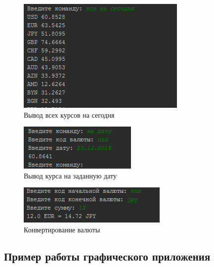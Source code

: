 \documentclass[a4paper]{article}
\begin{document}
\begin{figure}[H]
	\begin{center}
		\includegraphics[scale=1.2]{screen/console_2.png}
		\caption{Вывод всех курсов на сегодня} 
		\label{pic:pic_name} %
	\end{center}
\end{figure}

\begin{figure}[H]
	\begin{center}
		\includegraphics[scale=1.3]{screen/console_3.png}
		\caption{Вывод курса на заданную дату} 
		\label{pic:pic_name} %
	\end{center}
\end{figure}

\begin{figure}[H]
	\begin{center}
		\includegraphics[scale=1.2]{screen/console_4.png}
		\caption{Конвертирование валюты} 
		\label{pic:pic_name} %
	\end{center}
\end{figure}

\newpage

\subsection{Пример работы графического приложения}
\end{document}
